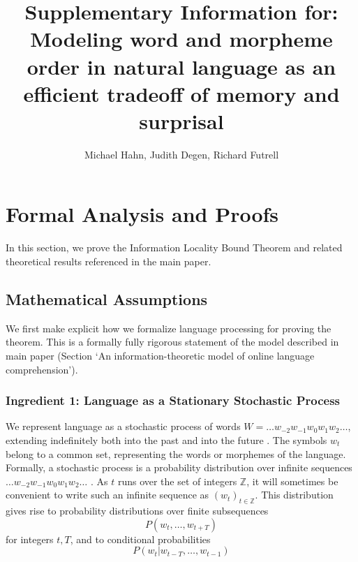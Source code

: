 \documentclass[11pt,letterpaper]{article}
\title{Supplementary Information for: Modeling word and morpheme order in natural language as an efficient tradeoff of memory and surprisal}
\author{Michael Hahn, Judith Degen, Richard Futrell}
\newcounter{theorem}
\begin{document}
\maketitle

\tableofcontents


%
%
%


\section{Formal Analysis and Proofs}

In this section, we prove the Information Locality Bound Theorem and related theoretical results referenced in the main paper.

\subsection{Mathematical Assumptions}\label{sec:math-assumptions}

We first make explicit how we formalize language processing for proving the theorem.
This is a formally fully rigorous statement of the model described in main paper (Section `An information-theoretic model of online language comprehension').


\subsubsection{Ingredient 1: Language as a Stationary Stochastic Process}
We represent language as a stochastic process of words $W = \dots w_{-2} w_{-1} w_0 w_{1} w_{2} \dots$, extending indefinitely both into the past and into the future \citep{doob1953stochastic}.
The symbols $w_t$ belong to a common set, representing the words or morphemes of the language.
Formally, a stochastic process is a probability distribution over infinite sequences $\dots w_{-2} w_{-1} w_0 w_{1} w_{2} \dots$ \citep{doob1953stochastic}.
As $t$ runs over the set of integers $\mathbb{Z}$, it will sometimes be convenient to write such an infinite sequence as $(w_t)_{t \in \mathbb{Z}}$.
This distribution gives rise to probability distributions over finite subsequences
\begin{equation}
	P(w_t, \dots, w_{t+T})
\end{equation}
for integers $t, T$, and to conditional probabilities
\begin{equation}
	P(w_t | w_{t-T}, \dots, w_{t-1})
\end{equation}
\end{document}
